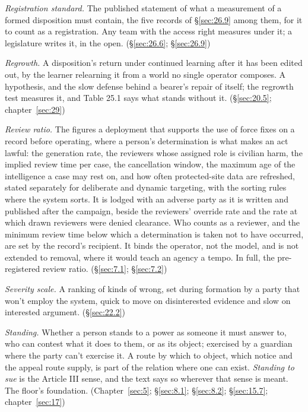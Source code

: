 \emph{Registration standard.} The published statement of what a measurement of a formed disposition must contain, the five records of \S\ref{sec:26.9} among them, for it to count as a registration. Any team with the access right measures under it; a legislature writes it, in the open. (\S\ref{sec:26.6}; \S\ref{sec:26.9})

\emph{Regrowth.} A disposition's return under continued learning after it has been edited out, by the learner relearning it from a world no single operator composes. A hypothesis, and the slow defense behind a bearer's repair of itself; the regrowth test measures it, and Table 25.1 says what stands without it. (\S\ref{sec:20.5}; chapter~\ref{sec:29})

\emph{Review ratio.} The figures a deployment that supports the use of force fixes on a record before operating, where a person's determination is what makes an act lawful: the generation rate, the reviewers whose assigned role is civilian harm, the implied review time per case, the cancellation window, the maximum age of the intelligence a case may rest on, and how often protected-site data are refreshed, stated separately for deliberate and dynamic targeting, with the sorting rules where the system sorts. It is lodged with an adverse party as it is written and published after the campaign, beside the reviewers' override rate and the rate at which drawn reviewers were denied clearance. Who counts as a reviewer, and the minimum review time below which a determination is taken not to have occurred, are set by the record's recipient. It binds the operator, not the model, and is not extended to removal, where it would teach an agency a tempo. In full, the pre-registered review ratio. (\S\ref{sec:7.1}; \S\ref{sec:7.2})

\emph{Severity scale.} A ranking of kinds of wrong, set during formation by a party that won't employ the system, quick to move on disinterested evidence and slow on interested argument. (\S\ref{sec:22.2})

\emph{Standing.} Whether a person stands to a power as someone it must answer to, who can contest what it does to them, or as its object; exercised by a guardian where the party can't exercise it. A route by which to object, which notice and the appeal route supply, is part of the relation where one can exist. \emph{Standing to sue} is the Article III sense, and the text says so wherever that sense is meant. The floor's foundation. (Chapter~\ref{sec:5}; \S\ref{sec:8.1}; \S\ref{sec:8.2}; \S\ref{sec:15.7}; chapter~\ref{sec:17})

